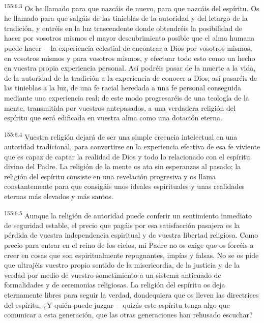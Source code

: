 \par 
\textsuperscript{155:6.3} Os he llamado para que nazcáis de nuevo, para que nazcáis del espíritu. Os he llamado para que salgáis de las tinieblas de la autoridad y del letargo de la tradición, y entréis en la luz trascendente donde obtendréis la posibilidad de hacer por vosotros mismos el mayor descubrimiento posible que el alma humana puede hacer ---la experiencia celestial de encontrar a Dios por vosotros mismos, en vosotros mismos y para vosotros mismos, y efectuar todo esto como un hecho en vuestra propia experiencia personal. Así podréis pasar de la muerte a la vida, de la autoridad de la tradición a la experiencia de conocer a Dios; así pasaréis de las tinieblas a la luz, de una fe racial heredada a una fe personal conseguida mediante una experiencia real; de este modo progresaréis de una teología de la mente, transmitida por vuestros antepasados, a una verdadera religión del espíritu que será edificada en vuestra alma como una dotación eterna.

\par 
\textsuperscript{155:6.4} Vuestra religión dejará de ser una simple creencia intelectual en una autoridad tradicional, para convertirse en la experiencia efectiva de esa fe viviente que es capaz de captar la realidad de Dios y todo lo relacionado con el espíritu divino del Padre. La religión de la mente os ata sin esperanzas al pasado; la religión del espíritu consiste en una revelación progresiva y os llama constantemente para que consigáis unos ideales espirituales y unas realidades eternas más elevados y más santos.

\par 
\textsuperscript{155:6.5} Aunque la religión de autoridad puede conferir un sentimiento inmediato de seguridad estable, el precio que pagáis por esa satisfacción pasajera es la pérdida de vuestra independencia espiritual y de vuestra libertad religiosa. Como precio para entrar en el reino de los cielos, mi Padre no os exige que os forcéis a creer en cosas que son espiritualmente repugnantes, impías y falsas. No se os pide que ultrajéis vuestro propio sentido de la misericordia, de la justicia y de la verdad por medio de vuestro sometimiento a un sistema anticuado de formalidades y de ceremonias religiosas. La religión del espíritu os deja eternamente libres para seguir la verdad, dondequiera que os lleven las directrices del espíritu. ¿Y quién puede juzgar ---quizás este espíritu tenga algo que comunicar a esta generación, que las otras generaciones han rehusado escuchar?

